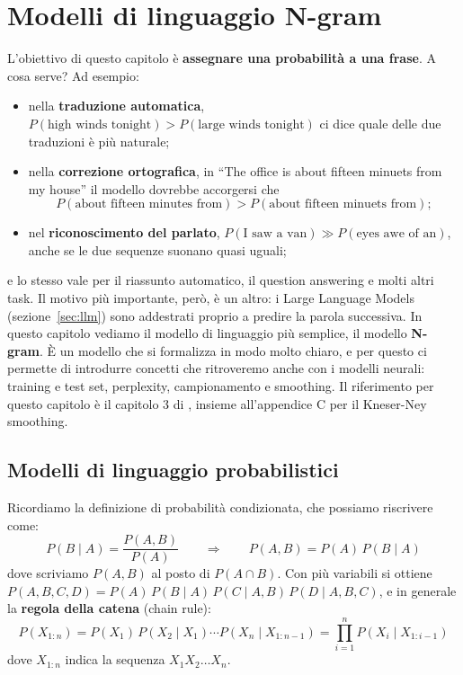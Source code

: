 \chapter{Modelli di linguaggio N-gram}\label{ch:ngram}
L'obiettivo di questo capitolo è \textbf{assegnare una probabilità a una frase}. A cosa serve? Ad esempio:
\begin{itemize}
    \item nella \textbf{traduzione automatica}, $P(\text{high winds tonight}) > P(\text{large winds tonight})$ ci dice quale delle due traduzioni è più naturale;
    \item nella \textbf{correzione ortografica}, in \enquote{The office is about fifteen minuets from my house} il modello dovrebbe accorgersi che \[P(\text{about fifteen minutes from}) > P(\text{about fifteen minuets from});\]
    \item nel \textbf{riconoscimento del parlato}, $P(\text{I saw a van}) \gg P(\text{eyes awe of an})$, anche se le due sequenze suonano quasi uguali;
\end{itemize}
e lo stesso vale per il riassunto automatico, il question answering e molti altri task. Il motivo più importante, però, è un altro: i Large Language Models (sezione~\ref{sec:llm}) sono addestrati proprio a predire la parola successiva. In questo capitolo vediamo il modello di linguaggio più semplice, il modello \textbf{N-gram}. È un modello che si formalizza in modo molto chiaro, e per questo ci permette di introdurre concetti che ritroveremo anche con i modelli neurali: training e test set, perplexity, campionamento e smoothing. Il riferimento per questo capitolo è il capitolo 3 di \cite{jurafsky2026slp}, insieme all'appendice C per il Kneser-Ney smoothing.

\section{Modelli di linguaggio probabilistici}
Ricordiamo la definizione di probabilità condizionata, che possiamo riscrivere come:
\[
P(B \mid A) = \frac{P(A, B)}{P(A)} \qquad \Longrightarrow \qquad P(A, B) = P(A)\, P(B \mid A)
\]
dove scriviamo $P(A, B)$ al posto di $P(A \cap B)$. Con più variabili si ottiene $P(A, B, C, D) = P(A)\, P(B \mid A)\, P(C \mid A, B)\, P(D \mid A, B, C)$, e in generale la \textbf{regola della catena} (chain rule):
\begin{equation}
P(X_{1:n}) = P(X_1)\, P(X_2 \mid X_1) \cdots P(X_n \mid X_{1:n-1}) = \prod_{i=1}^{n} P(X_i \mid X_{1:i-1})
\end{equation}
dove $X_{1:n}$ indica la sequenza $X_1 X_2 \dots X_n$.

